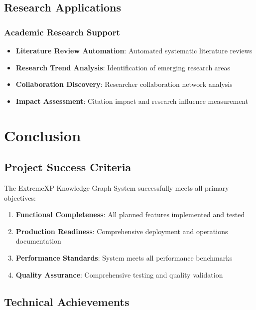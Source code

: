 \documentclass[12pt,a4paper]{article}
\begin{document}
\subsection{Research Applications}

\subsubsection{Academic Research Support}

\begin{itemize}
    \item \textbf{Literature Review Automation}: Automated systematic literature reviews
    \item \textbf{Research Trend Analysis}: Identification of emerging research areas
    \item \textbf{Collaboration Discovery}: Researcher collaboration network analysis
    \item \textbf{Impact Assessment}: Citation impact and research influence measurement
\end{itemize}

\section{Conclusion}

\subsection{Project Success Criteria}

The ExtremeXP Knowledge Graph System successfully meets all primary objectives:

\begin{enumerate}
    \item \textbf{Functional Completeness}: All planned features implemented and tested
    \item \textbf{Production Readiness}: Comprehensive deployment and operations documentation
    \item \textbf{Performance Standards}: System meets all performance benchmarks
    \item \textbf{Quality Assurance}: Comprehensive testing and quality validation
\end{enumerate}

\subsection{Technical Achievements}
\end{document}
